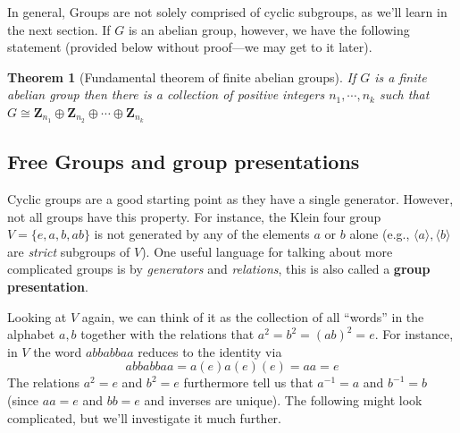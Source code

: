 \documentclass[12pt]{article}
\numberwithin{equation}{subsection}
\newtheorem{thm}[subsection]{Theorem}
\theoremstyle{note}
\newcommand{\Mod}[1]{\ (\mathrm{mod}\ #1)}
\begin{document}
	


In general, Groups are not solely comprised of cyclic subgroups, as we'll learn in the next section. If $G$ is an abelian group, however, we have the following statement (provided below without proof---we may get to it later).
\begin{thm}[Fundamental theorem of finite abelian groups]\label{FTFG}
	If $G$ is a finite abelian group then there is a collection of positive integers $n_1,\cdots,n_k$ such that $G\cong \mathbf{Z}_{n_1}\oplus \mathbf{Z}_{n_2} \oplus \cdots \oplus \mathbf{Z}_{n_k}$
\end{thm}



\subsection{Free Groups and group presentations}

Cyclic groups are a good starting point as they have a single generator. However, not all groups have this property. For instance, the Klein four group $V=\{e,a,b,ab\}$ is not generated by any of the elements $a$ or $b$ alone (e.g., $\langle a\rangle, \langle b\rangle$ are \textit{strict} subgroups of $V$). One useful language for talking about more complicated groups is by \textit{generators} and \textit{relations}, this is also called a \textbf{group presentation}.

Looking at $V$ again, we can think of it as the collection of all ``words'' in the alphabet $a,b$ together with the relations that $a^2=b^2=(ab)^2=e$. For instance, in $V$ the word $abbabbaa$ reduces to the identity via \[abbabbaa=a(e)a(e)(e)=aa=e\] The relations $a^2=e$ and $b^2=e$ furthermore tell us that $a^{-1}=a$ and $b^{-1}=b$ (since $aa=e$ and $bb=e$ and inverses are unique). The following might look complicated, but we'll investigate it much further.
\end{document}
